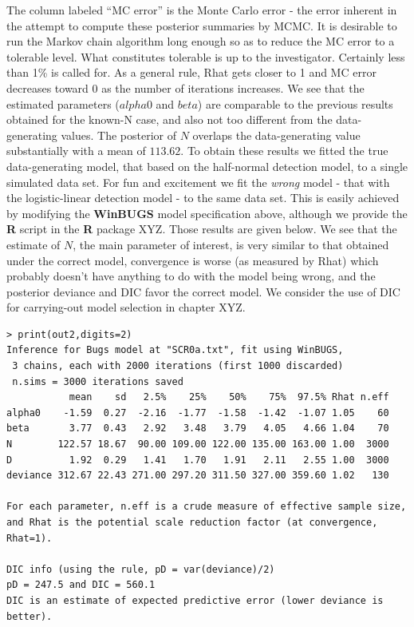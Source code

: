 The column labeled ``MC error'' is the Monte Carlo error - the error
inherent in the attempt to compute these posterior summaries by
MCMC. It is desirable to run the Markov chain algorithm long enough so
as to reduce the MC error to a tolerable level. What constitutes
tolerable is up to the investigator. Certainly less than 1\% is called
for. As a general rule, Rhat gets closer to 1 and MC error decreases
toward 0 as the number of iterations increases.  We see that the
estimated parameters ($alpha$0 and $beta$) are comparable to the
previous results obtained for the known-N case, and also not too
different from the data-generating values. The posterior of $N$
overlaps the data-generating value substantially with a mean of
$113.62$.  To obtain these results we fitted the true data-generating
model, that based on the half-normal detection model, to a single
simulated data set. For fun and excitement we fit the {\it wrong}
model - that with the logistic-linear detection model - to the same
data set. This is easily achieved by modifying the {\bf WinBUGS} model
specification above, although we provide the {\bf R} script in the
{\bf R} package XYZ.
Those results are given below. We see that the estimate of
$N$, the main parameter of interest, is very similar to that obtained
under the correct model, convergence is worse (as measured by Rhat)
which probably doesn't have anything to do with the model being wrong,
and the posterior deviance and DIC favor the correct model. We
consider the use of DIC for carrying-out model selection in chapter
XYZ.
{\small
\begin{verbatim}
> print(out2,digits=2)
Inference for Bugs model at "SCR0a.txt", fit using WinBUGS,
 3 chains, each with 2000 iterations (first 1000 discarded)
 n.sims = 3000 iterations saved
           mean    sd   2.5%    25%    50%    75%  97.5% Rhat n.eff
alpha0    -1.59  0.27  -2.16  -1.77  -1.58  -1.42  -1.07 1.05    60
beta       3.77  0.43   2.92   3.48   3.79   4.05   4.66 1.04    70
N        122.57 18.67  90.00 109.00 122.00 135.00 163.00 1.00  3000
D          1.92  0.29   1.41   1.70   1.91   2.11   2.55 1.00  3000
deviance 312.67 22.43 271.00 297.20 311.50 327.00 359.60 1.02   130

For each parameter, n.eff is a crude measure of effective sample size,
and Rhat is the potential scale reduction factor (at convergence, Rhat=1).

DIC info (using the rule, pD = var(deviance)/2)
pD = 247.5 and DIC = 560.1
DIC is an estimate of expected predictive error (lower deviance is better).
\end{verbatim}
}

